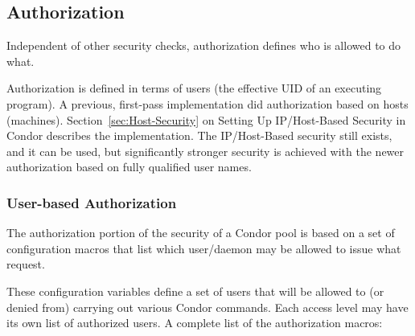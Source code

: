 \subsection{\label{sec:Security-Authorization} Authorization}

Independent of other security checks, authorization defines
who is allowed to do what.

Authorization is defined in terms of users (the effective UID
of an executing program).
A previous, first-pass implementation did authorization
based on hosts (machines).
Section~\ref{sec:Host-Security}
on Setting Up IP/Host-Based Security in Condor describes the
implementation.
The IP/Host-Based security still exists, and it can be used,
but significantly stronger security is achieved with the newer
authorization based on fully qualified user names.

\subsubsection{\label{sec:Security-UserAuthorization}User-based Authorization}

The authorization portion of the security of a Condor pool is
based on a set of configuration
macros that list which user/daemon may be allowed to issue what request.

These configuration variables define a set of users that will be
allowed to (or denied from) carrying out various Condor commands.
Each access level may have its own list of authorized users.
A complete list of the authorization macros:
\begin{description}
\item{}
\item{}
\item{}
\item{}
\item{}
\item{}
\item{}
\item{}
\item{}
\item{}
\item{}
\item{}
\item{}
\item{}
\end{description}

